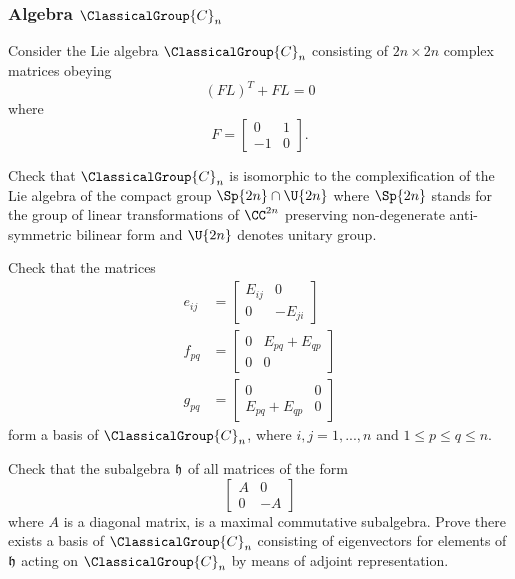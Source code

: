 \subsubsection{Algebra \texorpdfstring{$\ClassicalGroup{C}_{n}$}{Cn}}
Consider the Lie algebra $\ClassicalGroup{C}_{n}$ consisting of $2n\times2n$
complex matrices obeying
\begin{equation}
(FL)^{T}+FL=0
\end{equation}
where
\begin{equation}
F=\begin{bmatrix}0&1\\
-1&0
\end{bmatrix}.
\end{equation}

\begin{exercise}
Check that $\ClassicalGroup{C}_{n}$ is isomorphic to the complexification of the
Lie algebra of the compact group $\Sp{2n}\cap \U{2n}$ where
$\Sp{2n}$ stands for the group of linear transformations of
$\CC^{2n}$ preserving non-degenerate anti-symmetric bilinear
form and $\U{2n}$ denotes unitary group.
\end{exercise}
\begin{exercise}
Check that the matrices
\begin{subequations}
\begin{align}
e_{ij} &= \begin{bmatrix}E_{ij}&0\\0&-E_{ji}
\end{bmatrix}\\
f_{pq}&= \begin{bmatrix}0&E_{pq}+E_{qp}\\0&0
\end{bmatrix}\\
g_{pq}&=\begin{bmatrix}0&0\\E_{pq}+E_{qp}&0
\end{bmatrix}
\end{align}
\end{subequations}
form a basis of $\ClassicalGroup{C}_{n}$, where $i,j=1,...,n$ and $1\leq p\leq
q\leq n$.
\end{exercise}
\begin{exercise}
Check that the subalgebra $\frak{h}$ of all matrices of the form
\begin{equation}
\begin{bmatrix}
A&0\\
0&-A
\end{bmatrix}
\end{equation}
where $A$ is a diagonal matrix, is a maximal commutative
subalgebra. Prove there exists a basis of $\ClassicalGroup{C}_{n}$ consisting of
eigenvectors for elements of $\frak{h}$ acting on $\ClassicalGroup{C}_{n}$ by
means of adjoint representation.
\end{exercise}
